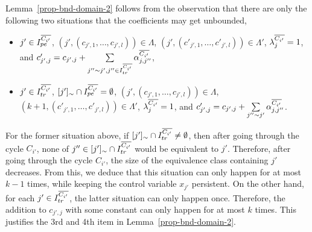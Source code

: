 Lemma~\ref{prop-bnd-domain-2} follows from the observation that there are only the following two situations that the coefficients may get unbounded, 
\begin{itemize}
\item  $j' \in I^{\overline{C_{i'}}}_{pe}$, $(j', (c_{j',1}, \dots, c_{j',l})) \in \Lambda$, $(j', (c'_{j', 1}, \dots, c'_{j', l})) \in \Lambda'$, $\lambda^{\overline{C_{i'}}}_j = 1$, and $c'_{j', j} = c_{j',j} + \sum \limits_{j'' \sim j', j'' \in I^{\overline{C_{i'}}}_{tr}} \alpha^{\overline{C_{i'}}}_{j, j''}$,
%
\item $j' \in I^{\overline{C_{i'}}}_{tr}$, $[j']_\sim \cap I^{\overline{C_{i'}}}_{pe} = \emptyset$, $(j', (c_{j',1}, \dots, c_{j',l})) \in \Lambda$, $(k+1, (c'_{j', 1}, \dots, c'_{j', l})) \in \Lambda'$, $\lambda^{\overline{C_{i'}}}_j = 1$, and $c'_{j', j} = c_{j',j} +  \sum \limits_{j'' \sim j'} \alpha^{\overline{C_{i'}}}_{j, j''}$.
\end{itemize}
For the former situation above, if $[j']_{\sim} \cap I^{\overline{C_{i'}}}_{tr} \neq \emptyset$, then after going through the cycle $C_{i'}$, none of $j'' \in [j']_{\sim} \cap I^{\overline{C_{i'}}}_{tr}$ would be equivalent to $j'$. Therefore, after going through the cycle $C_{i'}$, the size of the equivalence class containing $j'$ decreases. From this, we deduce that this situation can only happen for at most $k-1$ times, while keeping the control variable $x_{j'}$ persistent. On the other hand, for each $j' \in I^{\overline{C_{i'}}}_{tr}$, the latter situation can only happen once. Therefore, the addition to $c_{j', j}$ with some constant can only happen for at most $k$ times. This justifies the 3rd and 4th item in Lemma~\ref{prop-bnd-domain-2}.
%
\bigskip\\
\medskip\\

